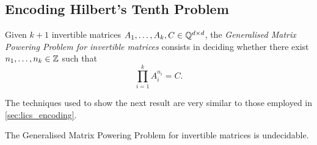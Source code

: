 \subsection{Encoding Hilbert's Tenth Problem}
\label{sec:matrix-undecidability}

Given $k+1$ invertible matrices $A_{1}, \ldots, A_{k},C \in \mathbb{Q}^{d \times d}$, the \emph{Generalised Matrix Powering Problem for invertible matrices} consists in deciding whether there exist $n_{1}, \ldots, n_{k} \in \mathbb{Z}$ such that
\begin{equation*}
\prod\limits_{i=1}^{k} A_{i}^{n_{i}} = C.
\end{equation*}

The techniques used to show the next result are very similar to those employed in \cref{sec:lics_encoding}.

\begin{theorem}
The Generalised Matrix Powering Problem for invertible matrices is undecidable.
\end{theorem}

